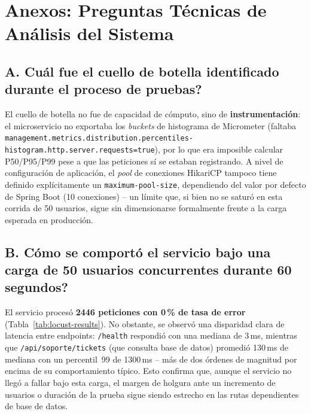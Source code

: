 ﻿\documentclass[11pt,a4paper]{article}
\begin{document}
\section{Anexos: Preguntas T\'ecnicas de An\'alisis del Sistema}

\subsection*{A. \textquestiondown Cu\'al fue el cuello de botella identificado durante el proceso de pruebas?}
El cuello de botella no fue de capacidad de c\'omputo, sino de \textbf{instrumentaci\'on}: el microservicio no exportaba los \textit{buckets} de histograma de Micrometer (faltaba \texttt{management.metrics.distribution.percentiles-histogram.http.server.requests=true}), por lo que era imposible calcular P50/P95/P99 pese a que las peticiones s\'i se estaban registrando. A nivel de configuraci\'on de aplicaci\'on, el \textit{pool} de conexiones HikariCP tampoco tiene definido expl\'icitamente un \texttt{maximum-pool-size}, dependiendo del valor por defecto de Spring Boot (10 conexiones) -- un l\'imite que, si bien no se satur\'o en esta corrida de 50 usuarios, sigue sin dimensionarse formalmente frente a la carga esperada en producci\'on.

\subsection*{B. \textquestiondown C\'omo se comport\'o el servicio bajo una carga de 50 usuarios concurrentes durante 60 segundos?}
El servicio proces\'o \textbf{2446 peticiones con 0\,\% de tasa de error} (Tabla~\ref{tab:locust-results}). No obstante, se observ\'o una disparidad clara de latencia entre endpoints: \texttt{/health} respondi\'o con una mediana de 3\,ms, mientras que \texttt{/api/soporte/tickets} (que consulta base de datos) promedi\'o 130\,ms de mediana con un percentil~99 de 1300\,ms -- m\'as de dos \'ordenes de magnitud por encima de su comportamiento t\'ipico. Esto confirma que, aunque el servicio no lleg\'o a fallar bajo esta carga, el margen de holgura ante un incremento de usuarios o duraci\'on de la prueba sigue siendo estrecho en las rutas dependientes de base de datos.
\end{document}
